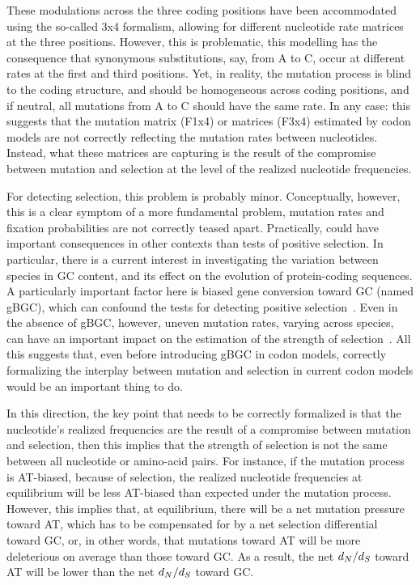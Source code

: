 These modulations across the three coding positions have been accommodated using the so-called 3x4 formalism, allowing for different nucleotide rate matrices at the three positions.
However, this is problematic, this modelling has the consequence that synonymous substitutions, say, from A to C, occur at different rates at the first and third positions.
Yet, in reality, the mutation process is blind to the coding structure, and should be homogeneous across coding positions, and if neutral, all mutations from A to C should have the same rate.
In any case: this suggests that the mutation matrix (F1x4) or matrices (F3x4) estimated by codon models are not correctly reflecting the mutation rates between nucleotides.
Instead, what these matrices are capturing is the result of the compromise between mutation and selection at the level of the realized nucleotide frequencies.

For detecting selection, this problem is probably minor.
Conceptually, however, this is a clear symptom of a more fundamental problem, mutation rates and fixation probabilities are not correctly teased apart.
Practically, could have important consequences in other contexts than tests of positive selection.
In particular, there is a current interest in investigating the variation between species in GC content, and its effect on the evolution of protein-coding sequences.
A particularly important factor here is biased gene conversion toward GC (named gBGC), which can confound the tests for detecting positive selection~\citep{Galtier2009,Ratnakumar2010, Figuet2014}.
Even in the absence of \acrshort{gBGC}, however, uneven mutation rates, varying across species, can have an important impact on the estimation of the strength of selection~\citep{Galtier2009,Ratnakumar2010, Figuet2014}.
All this suggests that, even before introducing \acrshort{gBGC} in codon models, correctly formalizing the interplay between mutation and selection in current codon models would be an important thing to do.

In this direction, the key point that needs to be correctly formalized is that the nucleotide's realized frequencies are the result of a compromise between mutation and selection, then this implies that the strength of selection is not the same between all nucleotide or amino-acid pairs.
For instance, if the mutation process is AT-biased, because of selection, the realized nucleotide frequencies at equilibrium will be less AT-biased than expected under the mutation process.
However, this implies that, at equilibrium, there will be a net mutation pressure toward AT, which has to be compensated for by a net selection differential toward GC, or, in other words, that mutations toward AT will be more deleterious on average than those toward GC.
As a result, the net $d_N / d_S$ toward AT will be lower than the net $d_N / d_S$ toward GC.

